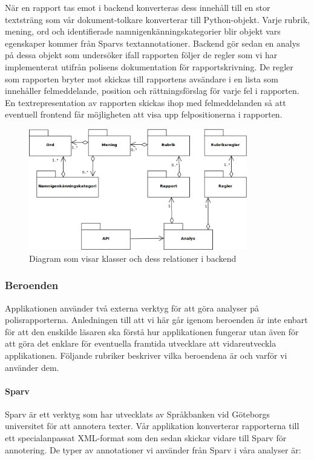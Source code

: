 \documentclass[swedish]{maucsthesis}
\begin{document}
När en rapport tas emot i backend konverteras dess innehåll till en stor
textsträng som vår dokument-tolkare konverterar till Python-objekt. Varje
rubrik, mening, ord och identifierade namnigenkänningskategorier blir objekt
vars egenskaper kommer från Sparvs textannotationer. Backend gör sedan en analys
på dessa objekt som undersöker ifall rapporten följer de regler som vi har
implementerat utifrån polisens dokumentation för rapportskrivning. De regler som
rapporten bryter mot skickas till rapportens avsändare i en lista som innehåller
felmeddelande, position och rättningsförslag för varje fel i rapporten. En
textrepresentation av rapporten skickas ihop med felmeddelanden så att eventuell
frontend får möjligheten att visa upp felpositionerna i rapporten.

\begin{figure}[H]
    \centering
    \includegraphics[width=0.85\textwidth]{backendklasser}
    \caption{Diagram som visar klasser och dess relationer i backend}
    \label{fig:erdbackend}
\end{figure}

\subsubsection{Beroenden}

Applikationen använder två externa verktyg för att göra analyser på
polisrapporterna. Anledningen till att vi här går igenom beroenden är inte
enbart för att den enskilde läsaren ska förstå hur applikationen fungerar utan
även för att göra det enklare för eventuella framtida utvecklare att
vidareutveckla applikationen. Följande rubriker beskriver vilka beroendena är
och varför vi använder dem.

\paragraph*{Sparv}
Sparv är ett verktyg som har utvecklats av Språkbanken vid Göteborgs universitet
för att annotera texter. Vår applikation konverterar rapporterna till ett
specialanpassat XML-format som den sedan skickar vidare till Sparv för
annotering. De typer av annotationer vi använder från Sparv i våra analyser är:
\end{document}
